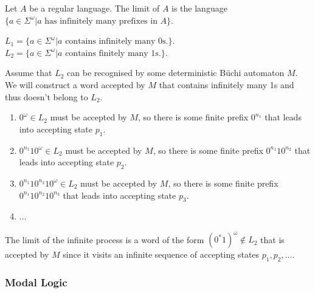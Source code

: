 Let \(A\) be a regular language. 
The limit of \(A\) is the language \(\{a \in \Sigma^\omega | a \text{ has infinitely many prefixes in } A\}\).

\(L_1 = \{a \in \Sigma^\omega | a \text{ contains infinitely many 0s.}\}\).
\\\(L_2 = \{a \in \Sigma^\omega | a \text{ contains finitely many 1s.}\}\).

{Assume that \(L_2\) can be recognised by some deterministic B{\"u}chi automaton \(M\).
We will construct a word accepted by \(M\) that contains infinitely many 1s and thus doesn't belong to \(L_2\).
\begin{enumerate}
    \item \(0^\omega \in L_2\) must be accepted by \(M\), so there is some finite prefix \(0^{n_1}\) that leads into accepting state \(p_1\).
    \item \(0^{n_1}10^\omega \in L_2\) must be accepted by \(M\), so there is some finite prefix \(0^{n_1}10^{n_2}\) that leads into accepting state \(p_2\).
    \item \(0^{n_1}10^{n_2}10^\omega \in L_2\) must be accepted by \(M\), so there is some finite prefix \(0^{n_1}10^{n_2}10^{n_3}\) that leads into accepting state \(p_3\).
    \item ...
\end{enumerate}
The limit of the infinite process is a word of the form \((0^*1)^\omega \notin L_2\) that is accepted by \(M\) since it visits an infinite sequence of accepting states \(p_1,p_2,...\).}

\subsubsection{Modal Logic}




